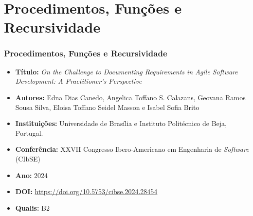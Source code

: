 \section{Procedimentos, Funções e Recursividade}
\begin{frame}
	\frametitle{Procedimentos, Funções e Recursividade}
	\begin{itemize}
		\item \textbf{Título:}	\textit{On the Challenge to Documenting Requirements in Agile Software Development: A Practitioner’s Perspective}
		
		
		\item \textbf{Autores:}	Edna Dias Canedo, Angelica Toffano S. Calazans, Geovana Ramos Sousa Silva, Eloisa Toffano Seidel Masson e Isabel Sofia Brito 
		
		\item \textbf{Instituições:} Universidade de Brasília e Instituto Politécnico de Beja, Portugal.
		
		\item \textbf{Conferência:}	XXVII Congresso Ibero-Americano em Engenharia de \textit{Software} (CIbSE) 
		
		\item \textbf{Ano:}	2024 
		
		\item \textbf{DOI:}	\url{https://doi.org/10.5753/cibse.2024.28454}
		
		\item \textbf{Qualis:} B2
	\end{itemize}
\end{frame}



